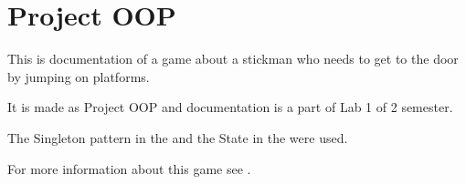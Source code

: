 \chapter{Project OOP}
\hypertarget{index}{}\label{index}
This is documentation of a game about a stickman who needs to get to the door by jumping on platforms.

It is made as Project OOP and documentation is a part of Lab 1 of 2 semester.

The Singleton pattern in the  and the State in the  were used.

For more information about this game see . 